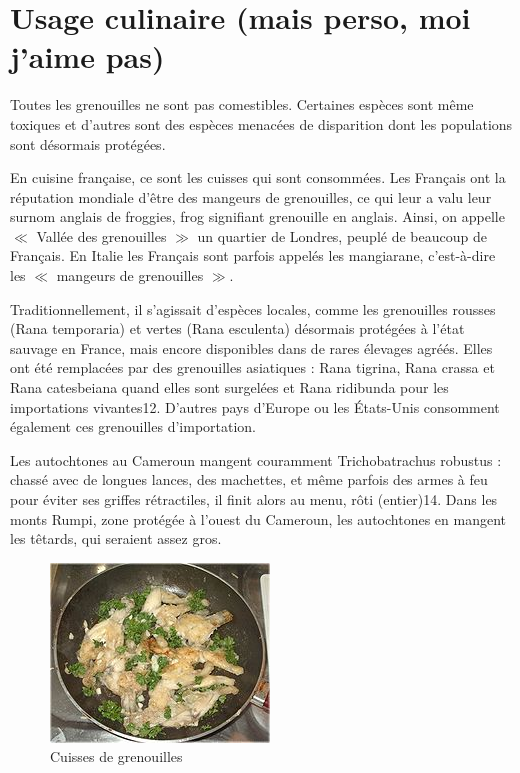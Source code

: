 \section{Usage culinaire (mais perso, moi j'aime pas)}

Toutes les grenouilles ne sont pas comestibles. 
Certaines espèces sont même toxiques et d'autres sont des espèces menacées de disparition dont les populations sont désormais protégées.

En cuisine française, ce sont les cuisses qui sont consommées. 
Les Français ont la réputation mondiale d'être des mangeurs de grenouilles, ce qui leur a valu leur surnom anglais de froggies, frog signifiant grenouille en anglais. 
Ainsi, on appelle $\ll$ Vallée des grenouilles $\gg$ un quartier de Londres, peuplé de beaucoup de Français.
En Italie les Français sont parfois appelés les mangiarane, c'est-à-dire les $\ll$ mangeurs de grenouilles $\gg$.

Traditionnellement, il s'agissait d'espèces locales, comme les grenouilles rousses (Rana temporaria) et vertes (Rana esculenta) désormais protégées à l'état sauvage en France, mais encore disponibles dans de rares élevages agréés. 
Elles ont été remplacées par des grenouilles asiatiques : Rana tigrina, Rana crassa et Rana catesbeiana quand elles sont surgelées et Rana ridibunda pour les importations vivantes12.
D'autres pays d'Europe ou les États-Unis consomment également ces grenouilles d'importation.

Les autochtones au Cameroun mangent couramment Trichobatrachus robustus : chassé avec de longues lances, des machettes, et même parfois des armes à feu pour éviter ses griffes rétractiles, il finit alors au menu, rôti (entier)14. 
Dans les monts Rumpi, zone protégée à l'ouest du Cameroun, les autochtones en mangent les têtards, qui seraient assez gros.

\begin{figure}
	\begin{center}
		\includegraphics[scale=1]{cuisine/miam.JPG}
			\caption{Cuisses de grenouilles}
			\label{fig:gre}
	\end{center}
\end{figure}